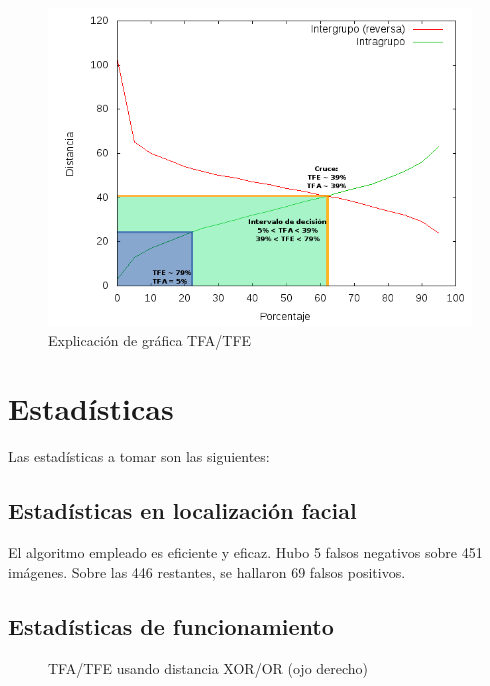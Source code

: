 \begin{figure}[h!]
	\centering
	\includegraphics[width=12cm]{imagenes/grafica_TFA.png}
	\caption{Explicación de gráfica TFA/TFE}
	\label{fig:example_TFA}
\end{figure}


\section{Estadísticas}

Las estadísticas a tomar son las siguientes:

\subsection{Estadísticas en localización facial}
El algoritmo empleado es eficiente y eficaz. Hubo 5 falsos negativos sobre 451 imágenes. Sobre las 446 restantes, se hallaron 69 falsos positivos. 

\subsection{Estadísticas de funcionamiento}

\begin{figure}[h!]
	\centering
			\resizebox{7.25cm}{!}{}
			\resizebox{7.25cm}{!}{}
			\resizebox{7.25cm}{!}{}
			\resizebox{7.25cm}{!}{}
			\resizebox{7.25cm}{!}{}
			\resizebox{7.25cm}{!}{}
        \caption{TFA/TFE usando distancia XOR/OR (ojo derecho)}
        \label{fig:superp-xor-od}
\end{figure}

